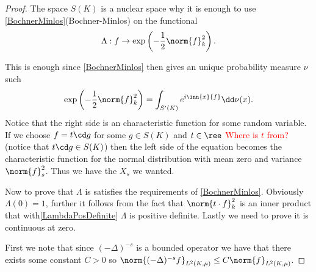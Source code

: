 \begin{proof}
	The space $S(K)$ is a nuclear space why it is enough to use \cref{BochnerMinlos}(Bochner-Minlos) on the functional
	\begin{equation}
		\Lambda : f \to \exp\left(-\frac{1}{2} \norm{f}^2_{k}\right).
	\end{equation}

This is enough since \cref{BochnerMinlos} then gives an unique probability measure $\nu$ such
\begin{equation}
	\exp \left(-\frac{1}{2} \norm{f}^{2}_{k}\right) = \int_{S'(K)} e^{i \inn{x}{f}} \dd \nu (x).
\end{equation}
Notice that the right side is an characteristic function for some random variable. If we choose $f= t\cd g$ for some $g \in S(K)$ and $t \in \ree$ \textcolor{red}{Where is $t$ from?}(notice that $t \cd g \in S(K)$) then the left side of the equation becomes the characteristic function for the normal distribution with mean zero and variance $\norm{f}_{s}^{2}$. Thus we have the $X_s$ we wanted.


Now to prove that $\Lambda$ is satisfies the requirements of \cref{BochnerMinlos}. Obviously $\Lambda(0) = 1$, further it follows from the fact that $\norm{t\cdot f}_{k}^{2}$ is an inner product that with\cref{LambdaPosDefinite} $\Lambda$ is positive definite. Lastly we need to prove it is continuous at zero. 

First we note that since $(-\Delta)^{-s}$ is a bounded operator we have that there exists some constant $C> 0$ so $\norm{(-\Delta)^{-s}f }_{L^{2}(K, \mu)} \leq C \norm{f}_{L^{2}(K, \mu)}$.


\end{proof}
